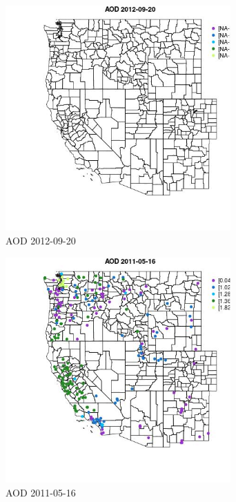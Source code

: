 \begin{figure} 
\centering  
\includegraphics[width=0.77\textwidth]{Code_Outputs/ML_input_report_ML_input_PM25_Step5_part_d_de_duplicated_aves_ML_input_MapObsAOD2012-09-20.jpg} 
\caption{\label{fig:ML_input_report_ML_input_PM25_Step5_part_d_de_duplicated_aves_ML_inputMapObsAOD2012-09-20}AOD 2012-09-20} 
\end{figure} 
 

\begin{figure} 
\centering  
\includegraphics[width=0.77\textwidth]{Code_Outputs/ML_input_report_ML_input_PM25_Step5_part_d_de_duplicated_aves_ML_input_MapObsAOD2011-05-16.jpg} 
\caption{\label{fig:ML_input_report_ML_input_PM25_Step5_part_d_de_duplicated_aves_ML_inputMapObsAOD2011-05-16}AOD 2011-05-16} 
\end{figure} 
 

